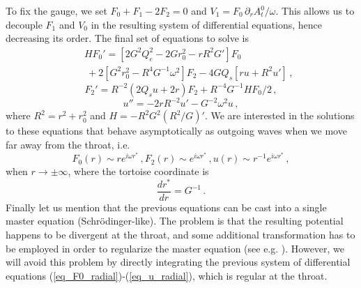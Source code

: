 \documentclass[floats,floatfix,showpacs,amssymb,prd,superscriptaddress,nofootinbib,nolongbibliography,reprint]{revtex4-2}
\newcommand\prlsec[1]{\vspace{2mm}\noindent {\textbf{  \textit{#1}}}}
\begin{document}
To fix the gauge, we set $F_0+F_1-2F_2=0$  
and $V_1 = F_0 \, \partial_r A_t^0/\omega$.
This allows us to decouple $F_1$ and $V_0$ 
in
the resulting system of differential equations, 
hence
decreasing its order.
The final set of equations to solve is
\begin{eqnarray}\label{eq_F0_radial}
 &&  H F_0' =  \left[ 2G^2Q_e^2 - 2Gr_0^2 - rR^2G'\right] F_0 \\
 && \:   +    2\left[ G^2 r_0^2 - 
 R^4 G^{-1}
 \omega^2 \right] F_2  -4G Q_s \left[ ru + R^2 u' \right] \, ,  \nonumber
\end{eqnarray}
\begin{equation}\label{eq_F2_radial}
   F_2'=
% 
    R^{-2}(2 Q_s u + 2 r) F_2
% 
   + R^{-4}G^{-1} H F_0 /2 \, ,
\end{equation}
\begin{equation}\label{eq_u_radial}
% 
    u''=-2rR^{-2}u'-G^{-2}\omega^2 u \, ,    
\end{equation}
%
where $R^2=r^2+r_0^2$ and $H=-R^2G^2(R^2/G)'$.
We are interested in the solutions 
to
these equations that behave asymptotically as outgoing waves when we move far away from the throat, 
i.e.
\begin{equation}
 {   F_0(r) \sim re^{i\omega r^*}\,, F_2(r) \sim e^{i\omega r^*}\,, u(r) \sim 
 r^{-1}
 e^{i\omega r^*}\,,  }
\end{equation}
%
when $r\to\pm\infty$,
where the tortoise coordinate is
\begin{equation}\label{tortoise}
    \frac{dr^*}{dr}=
%
G^{-1}\, .
\end{equation}
Finally let us mention that the previous equations can be cast into a single master equation (Schrödinger-like). The problem is that the resulting potential happens to be divergent at the throat, and some additional transformation has to be employed in order to regularize the master equation (see e.g. \cite{Gonzalez:2009hn, Bronnikov:2012ch, Torii:2013xba}). However, we will avoid this problem by directly integrating the previous system of differential equations (\ref{eq_F0_radial})-(\ref{eq_u_radial}), which is regular at the throat.



\prlsec{Spectral method.}
\end{document}
